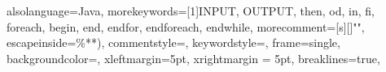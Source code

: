
{
	alsolanguage=Java,
	morekeywords=[1]{INPUT, OUTPUT, then, od, in, fi, foreach, begin, end, endfor, endforeach, endwhile},
	morecomment=[s][\color{darkred}]{"}{"},
	escapeinside={\%*}{*)},
	commentstyle=\color{cdc_Green},
	keywordstyle=\color{blue},
	frame=single,
	backgroundcolor=\color{white},
	xleftmargin=5pt,
	xrightmargin = 5pt,
	breaklines=true,
}




